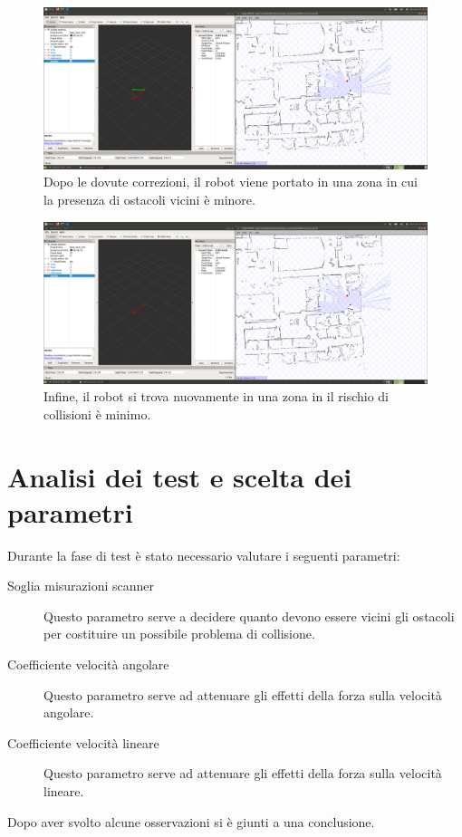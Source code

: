 \documentclass[Lau, binding=0.6cm, oneside]{sapthesis}
\begin{document}
\begin{figure}[htp]
    \centering
    \includegraphics[width=13.5cm]{rviz_force4.png}
    \caption{Dopo le dovute correzioni, il robot viene portato in una zona in cui la presenza di ostacoli vicini è minore.}
    \label{fig:rviz_force4}
\end{figure}
\begin{figure}[htp]
    \centering
    \includegraphics[width=13.5cm]{rviz_force5.png}
    \caption{Infine, il robot si trova nuovamente in una zona in il rischio di collisioni è minimo.}
    \label{fig:rviz_force5}
\end{figure}

\section{Analisi dei test e scelta dei parametri}
Durante la fase di test è stato necessario valutare i seguenti parametri:
\begin{description}
    \item[Soglia misurazioni scanner] Questo parametro serve a decidere quanto devono essere vicini gli ostacoli per costituire un possibile problema di collisione.
    \item[Coefficiente velocità angolare] Questo parametro serve ad attenuare gli effetti della forza sulla velocità angolare.
    \item[Coefficiente velocità lineare] Questo parametro serve ad attenuare gli effetti della forza sulla velocità lineare.
\end{description}
Dopo aver svolto alcune osservazioni si è giunti a una conclusione.
\end{document}
